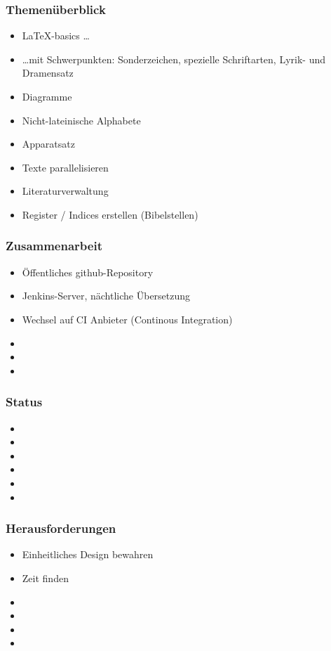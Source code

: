 \documentclass[12pt,ngerman]{beamer}
\begin{document}
\begin{frame}
\frametitle{Themenüberblick}


\begin{itemize}
\item \LaTeX-basics \ldots
  \item \ldots mit Schwerpunkten: Sonderzeichen, spezielle Schriftarten, Lyrik- und Dramensatz
\item Diagramme
\item Nicht-lateinische Alphabete
\item Apparatsatz
\item Texte parallelisieren
\item Literaturverwaltung
\item Register / Indices erstellen (Bibelstellen)
\end{itemize}
\end{frame}

\begin{frame}
\frametitle{Zusammenarbeit}


\begin{itemize}
\item Öffentliches github-Repository
\item Jenkins-Server, nächtliche Übersetzung
\item Wechsel auf CI Anbieter (Continous Integration)
\item
\item
\item
\end{itemize}
\end{frame}


\begin{frame}
\frametitle{Status}

\begin{itemize}
\item
\item
\item
\item
\item
\item
\end{itemize}
\end{frame}

\begin{frame}
\frametitle{Herausforderungen}


\begin{itemize}
\item Einheitliches Design bewahren
\item Zeit finden
\item
\item
\item
\item
\end{itemize}
\end{frame}
\end{document}
